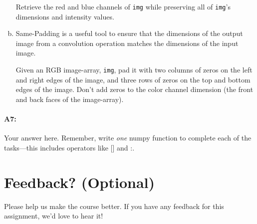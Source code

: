\begin{enumerate}[a.]
    Retrieve the red and blue channels of \texttt{img} while preserving all of \texttt{img}'s dimensions and intensity values.
    \item Same-Padding is a useful tool to ensure that the dimensions of the output image from a convolution operation matches the dimensions of the input image. 
    
    Given an RGB image-array, \texttt{img}, pad it with two columns of zeros on the left and right edges of the image, and three rows of zeros on the top and bottom edges of the image. Don't add zeros to the color channel dimension (the front and back faces of the image-array).
\end{enumerate}


\pagebreak
\paragraph{A7:} Your answer here. Remember, write \emph{one} numpy function to complete each of the tasks---this includes operators like [] and :.



\pagebreak
\section*{Feedback? (Optional)}
Please help us make the course better. If you have any feedback for this assignment, we'd love to hear it!


